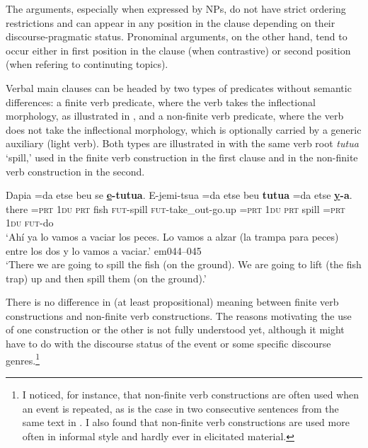\documentclass[output=paper,draft,draftmode,colorlinks,citecolor=brown]{langscibook}
\begin{document}
The arguments, especially when expressed by NPs, do not have strict ordering restrictions and can appear in any position in the clause depending on their discourse-pragmatic status. Pronominal arguments, on the other hand, tend to occur either in first position in the clause (when contrastive) or second position (when refering to continuting topics).

Verbal main clauses can be headed by two types of predicates without
semantic differences: a finite verb predicate,
where the verb takes the inflectional morphology, as illustrated in
, and a non-finite verb
predicate, where the verb does not take the inflectional morphology, which
is optionally carried by a generic auxiliary (light verb). Both types are
illustrated in  with the same verb root
\textit{tutua} `spill,' used in the finite verb construction in the first
clause and in the non-finite verb construction in the second.

\begin{exe}\ex
\label{ex:tacana-spill-the-fishes}
\gll Dapia  =da  etse  beu  se  \textbf{\uline{e}-tutua}.  E-jemi-tsua
=da  etse beu  \textbf{tutua}  =da  etse  \textbf{\uline{y}-a}.\\
    there  =\textsc{prt}  \textsc{1du}  \textsc{prt}  fish
    \textsc{fut}-spill  \textsc{fut}-take\_out-go.up  =\textsc{prt}
    1\textsc{du} \textsc{prt}  spill  =\textsc{prt}  1\textsc{du}
    \textsc{fut-}do\\
\glt ‘Ahí ya lo vamos a vaciar los peces. Lo vamos a alzar (la trampa para peces) entre los dos y lo vamos a vaciar.’ em044--045\\
`There we are going to spill the fish (on the ground). We are going
to lift (the fish trap) up and then spill them (on the ground).'
\end{exe}

There is no difference in (at least propositional) meaning between finite
verb constructions and non-finite verb constructions. The reasons
motivating the use of one construction or the other is not fully understood
yet, although it might have to do with the discourse status of the event or
some specific discourse genres.\footnote{I noticed, for instance, that non-finite verb constructions are often used when an event is repeated, as is the case in two consecutive sentences from the same text in . I also found that non-finite verb constructions are used more often in informal style and hardly ever in elicitated material.}
\end{document}

